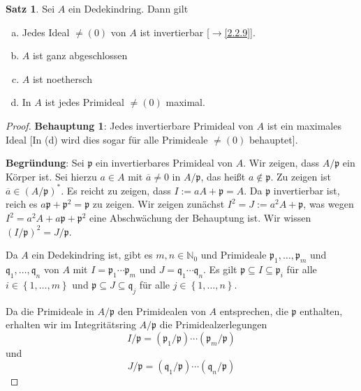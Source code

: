 \documentclass[
twoside=semi,
fontsize=12,
DIV=12, 
cleardoublepage=current,
leqno,
headings=optiontoheadandtoc, 
toc=idx
]{scrbook}
\newcommand{\N}{\mathbb{N}}
\newcommand{\set}[1]{\left\{ #1 \right\}}
\theoremstyle{definition}
\newtheorem{satz}[definition]{Satz}
\begin{document}
 	\begin{satz}\label{2.2.12}\hfill\newline
 		Sei $A$ ein Dedekindring. Dann gilt 
 		\begin{enumerate}[(a)]
 			\item Jedes Ideal $\neq (0)$ von $A$ ist invertierbar [$\to$\ref{2.2.9}].
 			\item $A$ ist ganz abgeschlossen
 			\item $A$ ist noethersch
 			\item In $A$ ist jedes Primideal $\neq (0)$ maximal.
 		\end{enumerate}
 	
 		\begin{proof}\hfill\newline
 			{\color{red}
 			\textbf{Behauptung 1}: Jedes invertierbare Primideal von $A$ ist ein maximales Ideal [In (d) wird dies sogar f\"ur alle Primideale $\neq (0)$ behauptet].
 			
 			\smallskip\noindent
 			\textbf{Begr\"undung}: Sei $\mathfrak{p}$ ein invertierbares Primideal von $A$. Wir zeigen, dass $A/\mathfrak{p}$ ein K\"orper ist. Sei hierzu $a \in A$ mit $\overline{a} \neq 0$ in $A/\mathfrak{p}$, das hei\ss t $a \notin \mathfrak{p}$. Zu zeigen ist $\overline{a} \in (A/\mathfrak{p})^*$. Es reicht zu zeigen, dass $I:= aA + \mathfrak{p} = A$. Da $\mathfrak{p}$ invertierbar ist, reich es $a\mathfrak{p} + \mathfrak{p}^2 = \mathfrak{p}$ zu zeigen. Wir zeigen zun\"achst $I^2 = J:= a^2A + \mathfrak{p}$, was wegen $I^2 = a^2A + a\mathfrak{p} + \mathfrak{p}^2$ eine Abschw\"achung der Behauptung ist. Wir wissen $(I/\mathfrak{p})^2 = J/\mathfrak{p}$.
 			
 			Da $A$ ein Dedekindring ist, gibt es $m,n \in \N_0$ und Primideale $\mathfrak{p}_1,\dots, \mathfrak{p}_m$ und $\mathfrak{q}_1,\dots, \mathfrak{q}_n$ von $A$ mit $I = \mathfrak{p}_1 \cdots \mathfrak{p}_m$ und $J = \mathfrak{q}_1 \cdots \mathfrak{q}_n$. Es gilt $\mathfrak{p} \subseteq I \subseteq \mathfrak{p}_i$ f\"ur alle $i \in \set{1,\dots, m}$ und $\mathfrak{p} \subseteq J \subseteq \mathfrak{q}_j$ f\"ur alle $j \in\set{1,\dots,n}$. 
 			
 			Da die Primideale in $A/\mathfrak{p}$ den Primidealen von $A$ entsprechen, die $\mathfrak{p}$ enthalten, erhalten wir im Integrit\"atsring $A/\mathfrak{p}$ die Primidealzerlegungen
 				\[I/\mathfrak{p} = (\mathfrak{p}_1/\mathfrak{p}) \cdots (\mathfrak{p}_m/\mathfrak{p})\]
 			und 
 				\[J/\mathfrak{p} = (\mathfrak{q}_1/\mathfrak{p}) \cdots (\mathfrak{q}_n/\mathfrak{p})\]
 			
}
\end{proof}
\end{satz}
\end{document}
